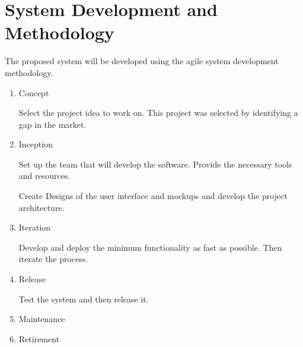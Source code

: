 \section{System Development and Methodology}

The proposed system will be developed using the agile system development methodology.

\begin{enumerate}
      \item Concept


            Select the project idea to work on. This project was selected by identifying a gap in the market.

      \item Inception


            Set up the team that will develop the software. Provide the necessary tools and resources.

            Create Designs of the user interface and mockups and develop the project architecture.

      \item Iteration


            Develop and deploy the minimum functionality as fast as possible. Then iterate the process.

      \item Release

            Test the system and then release it.

      \item Maintenance
      \item Retirement
\end{enumerate}
